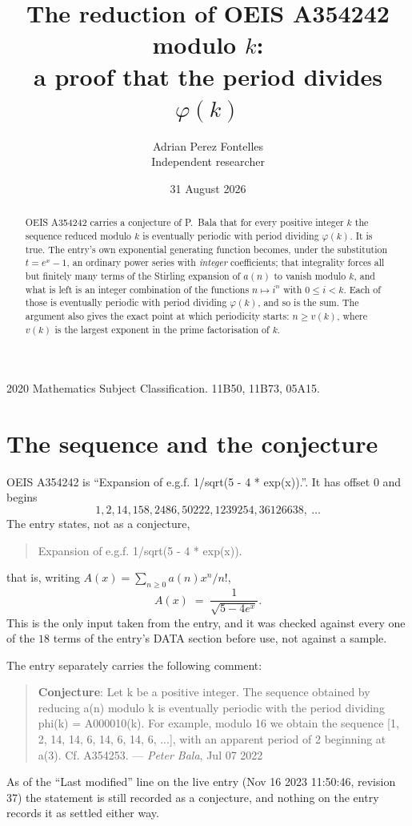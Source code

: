 \documentclass[11pt,a4paper]{article}
\title{The reduction of OEIS A354242 modulo $k$:\\ a proof that the period divides
$\varphi(k)$}
\author{Adrian Perez Fontelles\\ \small Independent researcher}
\date{31 August 2026}
\theoremstyle{plain}
\theoremstyle{definition}
\begin{document}
\maketitle

\begin{abstract}
OEIS A354242 carries a conjecture of P.~Bala that for every positive integer $k$ the
sequence reduced modulo $k$ is eventually periodic with period dividing $\varphi(k)$.
It is true. The entry's own exponential generating function becomes, under the
substitution $t=e^{x}-1$, an ordinary power series with \emph{integer} coefficients;
that integrality forces all but finitely many terms of the Stirling expansion of $a(n)$
to vanish modulo $k$, and what is left is an integer combination of the functions
$n\mapsto i^{n}$ with $0\le i<k$. Each of those is eventually periodic with period
dividing $\varphi(k)$, and so is the sum. The argument also gives the exact point at
which periodicity starts: $n\ge v(k)$, where $v(k)$ is the largest exponent in the
prime factorisation of $k$.
\end{abstract}

\noindent\small 2020 Mathematics Subject Classification. 11B50, 11B73, 05A15.\normalsize

\section{The sequence and the conjecture}

OEIS A354242 is ``Expansion of e.g.f. 1/sqrt(5 - 4 * exp(x)).''. It has offset $0$ and begins
\[
1, 2, 14, 158, 2486, 50222, 1239254, 36126638,\ \dots
\]
The entry states, not as a conjecture,
\begin{quote}\small
Expansion of e.g.f. 1/sqrt(5 - 4 * exp(x)).
\end{quote}
that is, writing $A(x)=\sum_{n\ge 0}a(n)x^{n}/n!$,
\begin{equation}\label{eq:egf}
A(x)\;=\;\frac{1}{\sqrt{5-4e^{x}}}.
\end{equation}
This is the only input taken from the entry, and it was checked against every one of the
$18$ terms of the entry's DATA section before use, not against a sample.

The entry separately carries the following comment:
\begin{quote}\small
\textbf{Conjecture}: Let k be a positive integer. The sequence obtained by reducing a(n) modulo k is eventually periodic with the period dividing phi(k) = A000010(k). For example, modulo 16 we obtain the sequence [1, 2, 14, 14, 6, 14, 6, 14, 6, ...], with an apparent period of 2 beginning at a(3). Cf. A354253. --- \emph{Peter Bala}, Jul 07 2022
\end{quote}
As of the ``Last modified'' line on the live entry (Nov 16 2023 11:50:46, revision
37) the statement is still recorded as a conjecture, and nothing on the entry
records it as settled either way.
\end{document}
